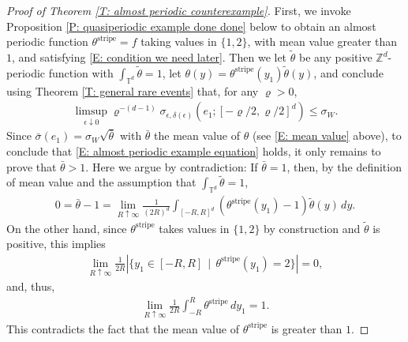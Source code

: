 \documentclass[12pt]{amsart}
\begin{document}
	\begin{proof}[Proof of Theorem \ref{T: almost periodic counterexample}] First, we invoke Proposition \ref{P: quasiperiodic example done done} below to obtain an almost periodic function $\theta^{\text{stripe}} = f$ taking values in $\{1,2\}$, with mean value greater than $1$, and satisfying \eqref{E: condition we need later}.  Then we let $\tilde{\theta}$ be any positive $\mathbb{Z}^{d}$-periodic function with $\int_{\mathbb{T}^{d}} \tilde{\theta} = 1$, let $\theta(y) = \theta^{\text{stripe}}(y_{1}) \tilde{\theta}(y)$, and conclude using Theorem \ref{T: general rare events} that, for any $\varrho > 0$,
		\begin{align*}
			\limsup_{ \epsilon \downarrow 0 } \varrho^{-(d-1)} \sigma_{\epsilon,\delta(\epsilon)} ( e_{1} ; [-\varrho/2,\varrho/2]^{d}) \leq \sigma_{W} .
		\end{align*}
	Since $\bar{\sigma}(e_{1}) = \sigma_{W} \sqrt{\bar{\theta}}$ with $\bar{\theta}$ the mean value of $\theta$ (see \eqref{E: mean value} above), to conclude that \eqref{E: almost periodic example equation} holds, it only remains to prove that $\bar{\theta} > 1$.  Here we argue by contradiction: If $\bar{\theta} = 1$, then, by the definition of mean value and the assumption that $\int_{\mathbb{T}^{d}} \tilde{\theta} = 1$,
		\begin{align*}
			0 = \bar{\theta} - 1 = \lim_{ R \uparrow \infty} \frac{ 1 }{ ( 2 R )^{ d } } \int_{ [ -R, R ]^{d} } ( \theta^{\text{stripe}}(y_{1}) - 1 ) \tilde{\theta}(y) \, dy.
		\end{align*}
	On the other hand, since $\theta^{\text{stripe}}$ takes values in $\{1,2\}$ by construction and $\tilde{\theta}$ is positive, this implies 
		\begin{align*}
			\lim_{ R \uparrow \infty } \frac{ 1 }{ 2 R } | \{ y_{1} \in [-R,R] \, \mid \, \theta^{\text{stripe}} (y_{1}) = 2 \} | = 0,
		\end{align*}
	and, thus, 
		\begin{align*}
			\lim_{ R \uparrow \infty } \frac{ 1 }{ 2 R } \int_{ -R }^{ R } \theta^{\text{stripe}} \, dy_{1} = 1.
		\end{align*}
	This contradicts the fact that the mean value of $\theta^{\text{stripe}}$ is greater than $1$. \end{proof}
	
\end{document}
